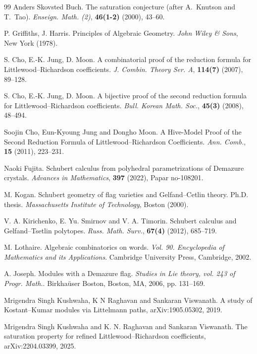 \documentclass[11pt,reqno]{amsart}
\begin{document}
\begin{thebibliography}{99}
 Anders Skovsted Buch. The saturation conjecture (after {A}.\ {K}nutson and {T}.\ {T}ao). {\it Enseign. Math. (2)}, {\bf 46(1-2)} (2000), 43--60.

P. Griffiths, J. Harris. Principles of Algebraic Geometry. {\it John Wiley \& Sons}, New York
(1978).

S. Cho, E.-K. Jung, D. Moon. A combinatorial proof of the reduction formula for Littlewood--Richardson coefficients. {\it J. Combin. Theory Ser. A}, {\bf 114(7)} (2007), 89--128.

S. Cho, E.-K. Jung, D. Moon. A bijective proof of the second reduction formula for Littlewood--Richardson coefficients. {\it Bull. Korean Math. Soc.}, { \bf 45(3)} (2008), 48--494.

Soojin Cho, Eun-Kyoung Jung and Dongho Moon. A Hive-Model Proof of the Second Reduction Formula of Littlewood--Richardson Coefficients. {\it Ann. Comb.}, {\bf 15} (2011), 223--231.

 Naoki Fujita. Schubert calculus from polyhedral parametrizations of Demazure crystals. {\it Advances in Mathematics}, {\bf 397} (2022), Papar no-108201.

 M. Kogan. Schubert geometry of flag varieties and Gelfand--Cetlin theory. Ph.D. thesis. {\it Massachusetts Institute of Technology}, Boston (2000).

 V. A. Kirichenko, E. Yu. Smirnov and V. A. Timorin. Schubert calculus and {G}elfand--{T}setlin polytopes. {\it Russ. Math. Surv.}, {\bf 67(4)} (2012), 685--719. 

 M. Lothaire. Algebraic combinatorics on words. {\it Vol. 90. Encyclopedia of Mathematics and its Applications}. Cambridge University Press, Cambridge, 2002.

 A. Joseph. Modules with a Demazure flag. {\it Studies in Lie theory, vol. 243 of Progr. Math.}. Birkha\"user Boston, Boston, MA, 2006, pp. 131--169. 

 Mrigendra Singh Kushwaha, K N Raghavan and Sankaran Viswanath. A study of Kostant--Kumar modules via Littelmann paths, arXiv:1905.05302, 2019.

Mrigendra Singh Kushwaha and K. N. Raghavan and Sankaran Viswanath. The saturation property for refined Littlewood--Richardson coefficients, arXiv:2204.03399, 2025.
\end{thebibliography}
\end{document}
